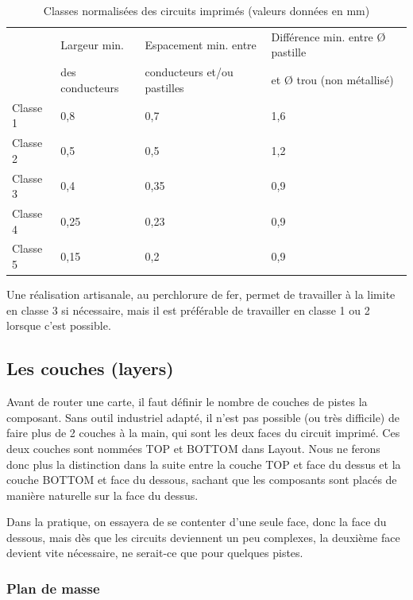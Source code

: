 \documentclass[a4paper]{article}
\begin{document}
\begin{table}[H]
	\centering
	\begin{tabular}{|l||l|l|l|}\hline
			 & Largeur min. & Espacement min. entre & Différence min. entre \O{} pastille\\
			 & des conducteurs & conducteurs et/ou pastilles & et \O{} trou (non métallisé)\\\hline\hline
			\cellcolor{green}Classe 1 & 0,8 & 0,7 & 1,6\\\hline
			\cellcolor{green}Classe 2 & 0,5 & 0,5 & 1,2\\\hline
			\cellcolor{yellow}Classe 3 & 0,4 & 0,35 & 0,9\\\hline
			\cellcolor{red}Classe 4 & 0,25 & 0,23 & 0,9\\\hline
			\cellcolor{red}Classe 5 & 0,15 & 0,2 & 0,9\\\hline
	\end{tabular}
	\caption{Classes normalisées des circuits imprimés (valeurs données en mm)
		\label{Classes_normalisees_des_circuits_imprimes}}
\end{table}

Une réalisation \og{}artisanale\fg{}, au perchlorure de fer, permet de travailler à la limite en classe 3 si nécessaire, mais il est préférable de travailler en classe 1 ou 2 lorsque c'est possible.

\subsection{Les couches (layers)}

Avant de router une carte, il faut définir le nombre de couches de pistes la composant. Sans outil industriel adapté, il n'est pas possible (ou très difficile) de faire plus de 2 couches \og{}à la main\fg{}, qui sont les deux faces du circuit imprimé. Ces deux couches sont nommées \og{}TOP\fg{} et \og{}BOTTOM\fg{} dans Layout. Nous ne ferons donc plus la distinction dans la suite entre la couche \og{}TOP\fg{} et face du dessus et la couche \og{}BOTTOM\fg{} et face du dessous, sachant que les composants sont placés de manière naturelle sur la face du dessus.

Dans la pratique, on essayera de se contenter d'une seule face, donc la face du dessous, mais dès que les circuits deviennent un peu complexes, la deuxième face devient vite nécessaire, ne serait-ce que pour quelques pistes.

\subsubsection{Plan de masse}
\end{document}
